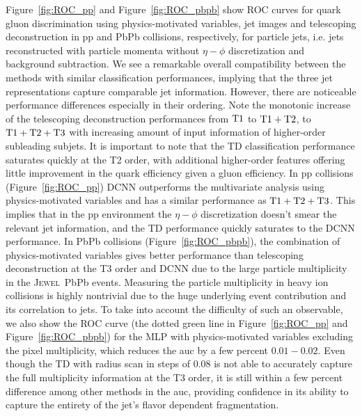 \documentclass[notoc,preprintnumbers]{JHEP3}
\newcommand{\jw}{\textsc{Jewel}~}
\begin{document}
Figure~\ref{fig:ROC_pp} and Figure~\ref{fig:ROC_pbpb} show ROC curves for quark gluon discrimination using physics-motivated variables, jet images and telescoping deconstruction in pp and PbPb collisions, respectively, for particle jets, i.e. jets reconstructed with particle momenta without $\eta-\phi$ discretization and background subtraction. We see a remarkable overall compatibility between the methods with similar classification performances, implying that the three jet representations capture comparable jet information. However, there are noticeable performance differences especially in their ordering. Note the monotonic increase of the telescoping deconstruction performances from $\rm T1$ to $\rm T1+T2$, to $\rm T1+T2+T3$ with increasing amount of input information of higher-order subleading subjets. It is important to note that the TD classification performance saturates quickly at the T2 order, with additional higher-order features offering little improvement in the quark efficiency given a gluon efficiency. In pp collisions (Figure~\ref{fig:ROC_pp}) DCNN outperforms the multivariate analysis using physics-motivated variables and has a similar performance as $\rm T1+T2+T3$. This implies that in the pp environment the $\eta-\phi$ discretization doesn't smear the relevant jet information, and the TD performance quickly saturates to the DCNN performance. In PbPb collisions (Figure~\ref{fig:ROC_pbpb}), the combination of physics-motivated variables gives better performance than telescoping deconstruction at the T3 order and DCNN due to the large particle multiplicity in the \jw PbPb events. Measuring the particle multiplicity in heavy ion collisions is highly nontrivial due to the huge underlying event contribution and its correlation to jets. To take into account the difficulty of such an observable, we also show the ROC curve (the dotted green line in Figure~\ref{fig:ROC_pp} and Figure~\ref{fig:ROC_pbpb}) for the MLP with physics-motivated variables excluding the pixel multiplicity, which reduces the auc by a few percent $0.01 - 0.02$. Even though the TD with radius scan in steps of 0.08 is not able to accurately capture the full multiplicity information at the T3 order, it is still within a few percent difference among other methods in the auc, providing confidence in its ability to capture the entirety of the jet's flavor dependent fragmentation.
\end{document}
